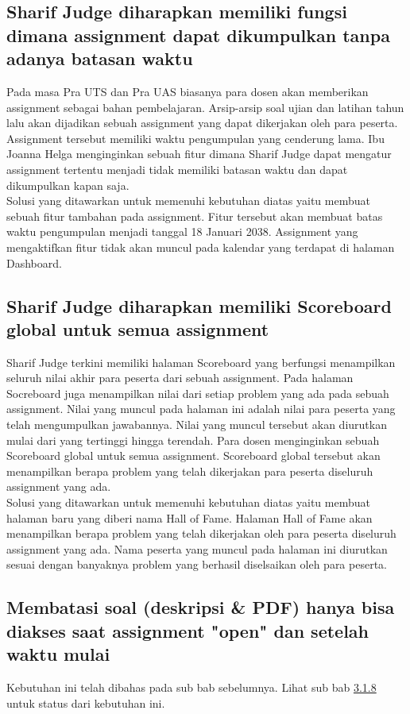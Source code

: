 \subsection{Sharif Judge diharapkan memiliki fungsi dimana assignment dapat dikumpulkan tanpa adanya batasan waktu}
Pada masa Pra UTS dan Pra UAS biasanya para dosen akan memberikan assignment sebagai bahan pembelajaran. Arsip-arsip soal ujian dan latihan tahun lalu akan dijadikan sebuah assignment yang dapat dikerjakan oleh para peserta. Assignment tersebut memiliki waktu pengumpulan yang cenderung lama. Ibu Joanna Helga menginginkan sebuah fitur dimana Sharif Judge dapat mengatur assignment tertentu menjadi tidak memiliki batasan waktu dan dapat dikumpulkan kapan saja. \\
Solusi yang ditawarkan untuk memenuhi kebutuhan diatas yaitu membuat sebuah fitur tambahan pada assignment. Fitur tersebut akan membuat batas waktu pengumpulan menjadi tanggal 18 Januari 2038. Assignment yang mengaktifkan fitur tidak akan muncul pada kalendar yang terdapat di halaman Dashboard.

\subsection{Sharif Judge diharapkan memiliki Scoreboard global untuk semua assignment}
Sharif Judge terkini memiliki halaman Scoreboard yang berfungsi menampilkan seluruh nilai akhir para peserta dari sebuah assignment. Pada halaman Socreboard juga menampilkan nilai dari setiap problem yang ada pada sebuah assignment. Nilai yang muncul pada halaman ini adalah nilai para peserta yang telah mengumpulkan jawabannya. Nilai yang muncul tersebut akan diurutkan mulai dari yang tertinggi hingga terendah. Para dosen menginginkan sebuah Scoreboard global untuk semua assignment. Scoreboard global tersebut akan menampilkan berapa problem yang telah dikerjakan para peserta diseluruh assignment yang ada. \\
Solusi yang ditawarkan untuk memenuhi kebutuhan diatas yaitu membuat halaman baru yang diberi nama Hall of Fame. Halaman Hall of Fame akan menampilkan berapa problem yang telah dikerjakan oleh para peserta diseluruh assignment yang ada. Nama peserta yang muncul pada halaman ini diurutkan sesuai dengan banyaknya problem yang berhasil diselsaikan oleh para peserta.

\subsection{Membatasi soal (deskripsi \& PDF) hanya bisa diakses saat assignment "open" dan setelah waktu mulai}
Kebutuhan ini telah dibahas pada sub bab sebelumnya. Lihat sub bab \hyperref[subsec:membatasisoal]{3.1.8} untuk status dari kebutuhan ini.

